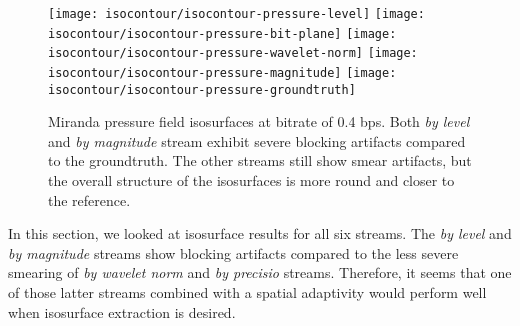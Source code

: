 \begin{figure}[h]
	\centering
	{\texttt{[image: isocontour/isocontour-pressure-level]}}
	{\texttt{[image: isocontour/isocontour-pressure-bit-plane]}}
	{\texttt{[image: isocontour/isocontour-pressure-wavelet-norm]}}
	{\texttt{[image: isocontour/isocontour-pressure-magnitude]}}
	{\texttt{[image: isocontour/isocontour-pressure-groundtruth]}}
	\caption{Miranda pressure field isosurfaces at bitrate of 0.4 bps. Both {\em by level}
        and {\em by magnitude} stream exhibit severe blocking artifacts compared to the groundtruth. The other streams
        still show smear artifacts, but the overall structure of the isosurfaces is more round and closer to the
        reference.}
	\label{fig:isocontour-surfaces}
\end{figure}




In this section, we looked at isosurface results for all six streams. The {\em by level} and {\em by magnitude} streams
show blocking artifacts compared to the less severe smearing of {\em by wavelet norm} and {\em by precisio} streams. Therefore,
it seems that one of those latter streams combined with a spatial adaptivity would perform well when isosurface
extraction is desired.
